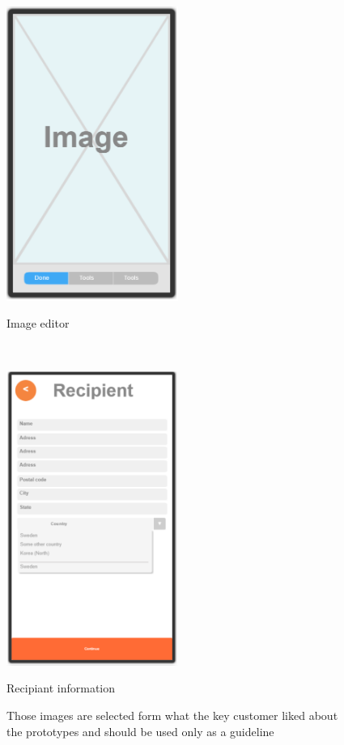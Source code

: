 \documentclass[10pt,a4paper]{article}
\begin{document}
\begin {description}
\begin{figure}[p]
\begin{minipage}{0.5\textwidth}
	\end{minipage}\\[0.5cm]
	\begin{minipage}{0.5\textwidth}
	\centering
		\includegraphics[width=0.5\textwidth]{Prototype_img/p3.png}
		\caption{Image editor}
		\label{fig:p3}
	\end{minipage}~
	\begin{minipage}{0.5\textwidth}
	\centering
		\includegraphics[width=0.5\textwidth]{Prototype_img/p4.png}
		\caption{Recipiant information}
		\label{fig:p4}
	\end{minipage}
	\caption{Those images are selected form what the key customer liked about the prototypes and should be used only as a guideline}
\end{figure}


\end{description}
\end{document}
